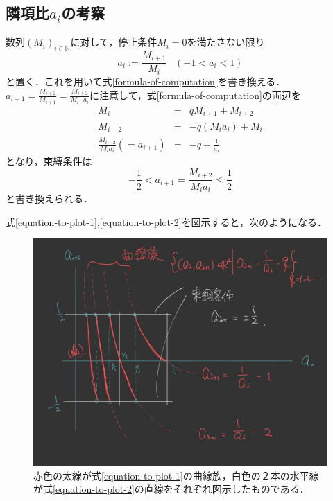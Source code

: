 \documentclass[uplatex, dvipdfmx]{jsarticle}
\begin{document}
\subsection{隣項比$a_i$の考察}

数列$(M_i)_{i\in\mathbb{N}}$に対して，停止条件$M_i=0$を満たさない限り
\[a_i:=\frac{M_{i+1}}{M_i}\;\;\;(-1<a_i<1)\]
と置く．これを用いて式\ref{formula-of-computation}を書き換える．
$a_{i+1}=\frac{M_{i+2}}{M_{i+1}}=\frac{M_{i+2}}{M_i\cdot a_i}$に注意して，式\ref{formula-of-computation}の両辺を
\begin{eqnarray}
    M_i&=&qM_{i+1}+M_{i+2} \\
    M_{i+2}&=& -q(M_ia_i)+M_i \\
    \frac{M_{i+2}}{M_ia_i}(=a_{i+1})&=& -q+\frac{1}{a_i} \label{equation-to-plot-1}
\end{eqnarray}
となり，束縛条件は
\begin{equation}
    -\frac{1}{2}<a_{i+1}=\frac{M_{i+2}}{M_ia_i}\le \frac{1}{2} \label{equation-to-plot-2}
\end{equation}
と書き換えられる．

式\ref{equation-to-plot-1},\ref{equation-to-plot-2}を図示すると，次のようになる．
\begin{center}
    \begin{figure}[h]\caption{\label{picture}赤色の太線が式\ref{equation-to-plot-1}の曲線族，白色の２本の水平線が式\ref{equation-to-plot-2}の直線をそれぞれ図示したものである．}
        \includegraphics[width=18cm]{計算理論.jpg}
    \end{figure}
\end{center}
\end{document}
